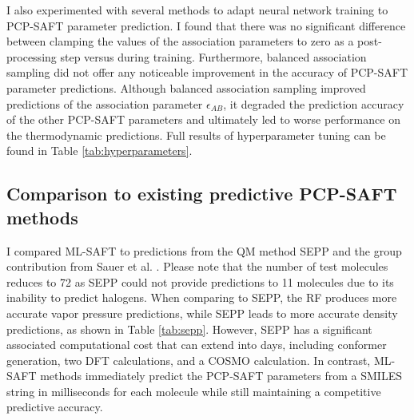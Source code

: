 I also experimented with several methods to adapt neural network training to PCP-SAFT parameter prediction. I found that there was no significant difference between clamping the values of the association parameters to zero as a post-processing step versus during training. Furthermore, balanced association sampling did not offer any noticeable improvement in the accuracy of PCP-SAFT parameter predictions. Although balanced association sampling improved predictions of the association parameter $\epsilon_{AB}$, it degraded the prediction accuracy of the other PCP-SAFT parameters and ultimately led to worse performance on the thermodynamic predictions. Full results of hyperparameter tuning can be found in Table \ref{tab:hyperparameters}.



\subsection{Comparison to existing predictive PCP-SAFT methods}

I compared ML-SAFT to predictions from the QM method SEPP \cite{Kaminski2020} and the group contribution from Sauer et al. \cite{Sauer2014}.  Please note that the number of test molecules reduces to 72 as SEPP could not provide predictions to 11 molecules due to its inability to predict halogens. When comparing to SEPP, the RF produces more accurate vapor pressure predictions, while SEPP leads to more accurate density predictions, as shown in Table \ref{tab:sepp}. However, SEPP has a significant associated computational cost that can extend into days, including conformer generation, two DFT calculations, and a COSMO calculation. In contrast, ML-SAFT methods immediately predict the PCP-SAFT parameters from a SMILES string in milliseconds for each molecule while still maintaining a competitive predictive accuracy.  



